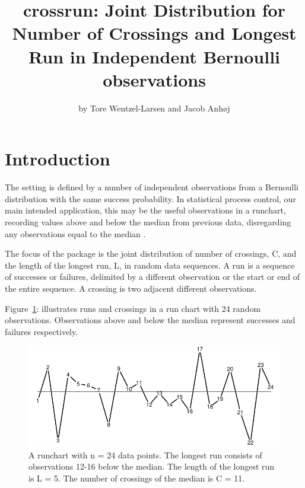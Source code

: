 \title{crossrun: Joint Distribution for Number of Crossings and Longest Run in Independent Bernoulli observations}
\author{by Tore Wentzel-Larsen and Jacob Anh{\o}j}

\maketitle


\section{Introduction}

The setting is defined by a number of independent observations from a Bernoulli distribution with the same success probability. In statistical process control, our main intended application, this may be the useful observations in a runchart, recording values above and below the median from previous data, disregarding any observations equal to the median \citep{Anhoej:2015}. 

The focus of the  package is the joint distribution of number of crossings, C, and the length of the longest run, L, in random data sequences. A run is a sequence of successes or failures, delimited by a different observation or the start or end of the entire sequence. A crossing is two adjacent different observations. 

Figure~\ref{figure:fig1}: illustrates runs and crossings in a run chart with 24 random observations. Observations above and below the median represent successes and failures respectively.

\begin{figure}[htbp]
  \centering
  \caption{A runchart with n = 24 data points. The longest run consists of observations 12-16 below the median. The length of the longest run is L = 5. The number of crossings of the median is C = 11.}
  \label{figure:fig1}
  \includegraphics{fig1}
\end{figure}

